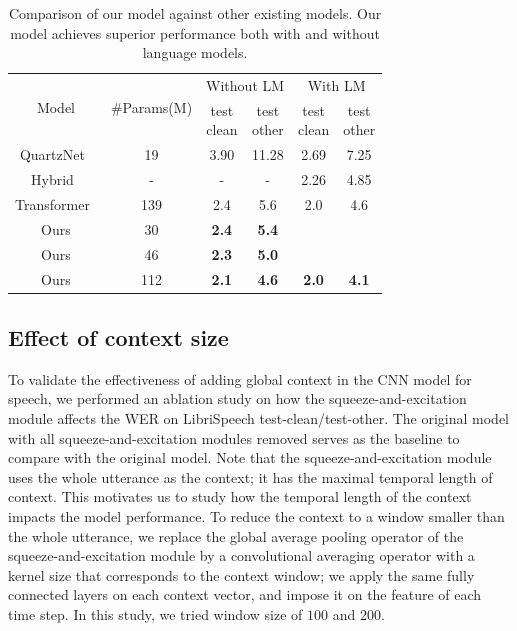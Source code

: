 \begin{table}
\begin{centering}
\begin{tabular}{c|c|cc|cc}
\hline 
\multirow{2}{*}[-0.5em]{Model} & \multirow{2}{*}[-0.5em]{\#Params(M)} & \multicolumn{2}{c|}{Without LM} & \multicolumn{2}{c}{With LM}\\ \cline{3-6}
& & \makecell{test\\ clean} & \makecell{test\\ other} & \makecell{test \\clean} & \makecell{test \\ other}\\
\hline 
\hline 
QuartzNet~\cite{kriman2019quartznet}& 19 &3.90 & 11.28 & 2.69 & 7.25\tabularnewline
Hybrid~\cite{wang2019transformer}& - & - & - & 2.26 & 4.85\tabularnewline
Transformer~\cite{zhang2020transformer} & 139 & 2.4 & 5.6 & 2.0 & 4.6\tabularnewline
Ours & 30 & \textbf{2.4} & \textbf{5.4} &  & \tabularnewline
Ours & 46 & \textbf{2.3} & \textbf{5.0} &  & \tabularnewline
Ours & 112 & \textbf{2.1} & \textbf{4.6} & \textbf{2.0} & \textbf{4.1}
\\\hline
\hline 
\end{tabular}
\par\end{centering}
\caption{Comparison of our model against other existing models. Our model achieves superior performance both with and without language models.}
\label{tab:libri_speech_main}
\end{table}


\subsection{Effect of context size}
To validate the effectiveness of adding global context in the CNN model for speech, we performed an ablation study on how the squeeze-and-excitation module affects the WER on LibriSpeech test-clean/test-other. The original model with all squeeze-and-excitation modules removed serves as the baseline to compare with the original model. 
Note that the squeeze-and-excitation module uses the whole utterance as the context; it has the maximal temporal length of context. This motivates us to study how the temporal length of the context impacts the model performance. To reduce the context to a window smaller than the whole utterance, we replace the global average pooling operator of the squeeze-and-excitation module by a convolutional averaging operator with a kernel size that corresponds to the context window; we apply the same fully connected layers on each context vector, and impose it on the feature of each time step. In this study, we tried window size of $100$ and $200$. 

